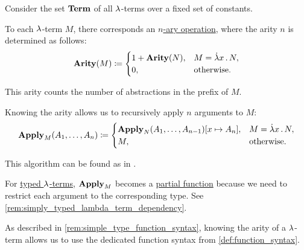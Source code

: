 \begin{algorithm}\label{alg:untyped_lambda_term_to_function}
  Consider the set \hyperref[def:lambda_term/term]{\( \op*{Term} \)} of all \( {\mathrm \lambda} \)-terms over a fixed set of constants.

  To each \( {\mathrm \lambda} \)-term \( M \), there corresponds an \hyperref[def:operation_on_set]{\( n \)-ary operation}, where the arity \( n \) is determined as follows:
  \begin{equation}\label{eq:alg:untyped_lambda_term_to_function/arity}
    \op*{Arity}(M) \coloneqq \begin{cases}
      1 + \op*{Arity}(N), &M = \qabs x N, \\
      0,                  &\T{otherwise.}
    \end{cases}
  \end{equation}

  This arity counts the number of abstractions in the prefix of \( M \).

  Knowing the arity allows us to recursively apply \( n \) arguments to \( M \):
  \begin{equation}\label{eq:alg:untyped_lambda_term_to_function/apply}
    \op*{Apply}_M(A_1, \ldots, A_n) \coloneqq \begin{cases}
      \op*{Apply}_N(A_1, \ldots, A_{n-1})[x \mapsto A_n], &M = \qabs x N, \\
      M,                                                   &\T{otherwise.}
    \end{cases}
  \end{equation}
\end{algorithm}
\begin{comments}
  \item This algorithm can be found as  in \cite{notebook:code}.

  \item For \hyperref[def:typed_lambda_term]{typed \( {\mathrm \lambda} \)-terms}, \( \op*{Apply}_M \) becomes a \hyperref[def:set_valued_map/partial]{partial function} because we need to restrict each argument to the corresponding type. See \cref{rem:simply_typed_lambda_term_dependency}.

  \item As described in \cref{rem:simple_type_function_syntax}, knowing the arity of a \( {\mathrm \lambda} \)-term allows us to use the dedicated function syntax from \cref{def:function_syntax}.
\end{comments}

